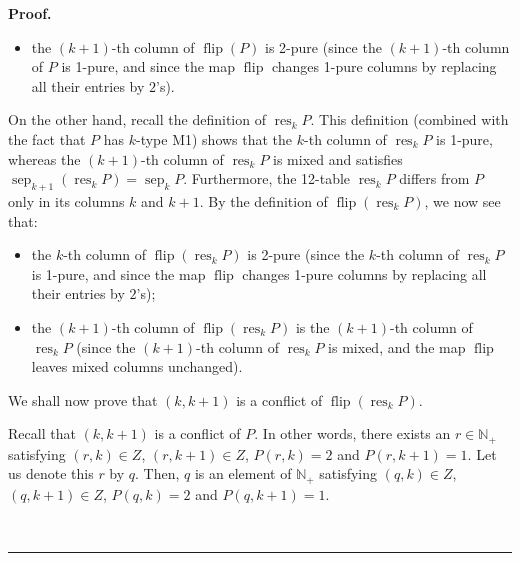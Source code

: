 \documentclass[numbers=enddot,12pt,final,onecolumn,notitlepage]{scrartcl}%
\theoremstyle{definition}
\newenvironment{proof}[1][Proof]{\noindent\textbf{#1.} }{\ \rule{0.5em}{0.5em}}
\newenvironment{verlong}{}{}
\begin{document}
\begin{verlong}
\begin{proof}
\begin{itemize}
\item the $\left(  k+1\right)  $-th column of $\operatorname*{flip}\left(
P\right)  $ is 2-pure (since the $\left(  k+1\right)  $-th column of $P$ is
1-pure, and since the map $\operatorname*{flip}$ changes 1-pure columns by
replacing all their entries by $2$'s).
\end{itemize}

On the other hand, recall the definition of $\operatorname*{res}%
\nolimits_{k}P$. This definition (combined with the fact that $P$ has $k$-type
M1) shows that the $k$-th column of $\operatorname*{res}_{k}P$ is 1-pure,
whereas the $\left(  k+1\right)  $-th column of $\operatorname*{res}%
\nolimits_{k}P$ is mixed and satisfies $\operatorname*{sep}\nolimits_{k+1}%
\left(  \operatorname*{res}\nolimits_{k}P\right)  =\operatorname*{sep}%
\nolimits_{k}P$. Furthermore, the 12-table $\operatorname*{res}\nolimits_{k}P$
differs from $P$ only in its columns $k$ and $k+1$. By the definition of
$\operatorname*{flip}\left(  \operatorname*{res}\nolimits_{k}P\right)  $, we
now see that:

\begin{itemize}
\item the $k$-th column of $\operatorname*{flip}\left(  \operatorname*{res}%
\nolimits_{k}P\right)  $ is 2-pure (since the $k$-th column of
$\operatorname*{res}\nolimits_{k}P$ is 1-pure, and since the map
$\operatorname*{flip}$ changes 1-pure columns by replacing all their entries
by $2$'s);

\item the $\left(  k+1\right)  $-th column of $\operatorname*{flip}\left(
\operatorname*{res}\nolimits_{k}P\right)  $ is the $\left(  k+1\right)  $-th
column of $\operatorname*{res}\nolimits_{k}P$ (since the $\left(  k+1\right)
$-th column of $\operatorname*{res}\nolimits_{k}P$ is mixed, and the map
$\operatorname*{flip}$ leaves mixed columns unchanged).
\end{itemize}

We shall now prove that $\left(  k,k+1\right)  $ is a conflict of
$\operatorname*{flip}\left(  \operatorname*{res}\nolimits_{k}P\right)  $.

Recall that $\left(  k,k+1\right)  $ is a conflict of $P$. In other words,
there exists an $r\in\mathbb{N}_{+}$ satisfying $\left(  r,k\right)  \in Z$,
$\left(  r,k+1\right)  \in Z$, $P\left(  r,k\right)  =2$ and $P\left(
r,k+1\right)  =1$. Let us denote this $r$ by $q$. Then, $q$ is an element of
$\mathbb{N}_{+}$ satisfying $\left(  q,k\right)  \in Z$, $\left(
q,k+1\right)  \in Z$, $P\left(  q,k\right)  =2$ and $P\left(  q,k+1\right)
=1$.


\end{proof}
\end{verlong}
\end{document}

